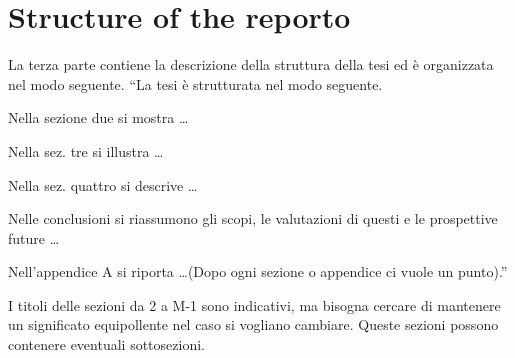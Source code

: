 \section{Structure of the reporto}
La terza parte contiene la descrizione della struttura della tesi ed \`e organizzata nel modo seguente.
``La tesi \`e strutturata nel modo seguente.

Nella sezione due si mostra \dots

Nella sez. tre si illustra \dots

Nella sez. quattro si descrive \dots

Nelle conclusioni si riassumono gli scopi, le valutazioni di questi e le prospettive future \dots

Nell'appendice A si riporta \dots (Dopo ogni sezione o appendice ci vuole un punto).''

I titoli delle sezioni da 2 a M-1 sono indicativi, ma bisogna cercare di mantenere un significato equipollente nel caso si vogliano cambiare. Queste sezioni possono contenere eventuali sottosezioni.


